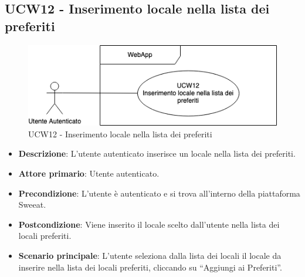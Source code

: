 \subsection{UCW12 - Inserimento locale nella lista dei preferiti}
\begin{figure}[!h]
\centering
    \includegraphics[scale=0.5]{UC_images/UCW12.png} 
    \caption{UCW12 - Inserimento locale nella lista dei preferiti}
\end{figure}
\begin{itemize}
    \item \textbf{Descrizione}: L'utente autenticato inserisce un locale nella lista dei preferiti.
    \item \textbf{Attore primario}: Utente autenticato.
    \item \textbf{Precondizione}: L'utente è autenticato e si trova all’interno della piattaforma Sweeat.
    \item \textbf{Postcondizione}: Viene inserito il locale scelto dall’utente nella lista dei locali preferiti.
    \item \textbf{Scenario principale}: L’utente seleziona dalla lista dei locali il locale da inserire nella lista dei locali preferiti, cliccando su “Aggiungi ai Preferiti”.
\end{itemize}

